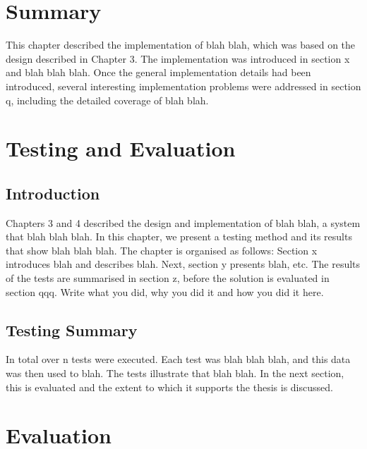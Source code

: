 \section{Summary} \label{s-i--summary}

This chapter described the implementation of blah blah, which was based on the design described in Chapter 3. The implementation was introduced in section x and blah blah blah. Once the general implementation details had been introduced, several interesting implementation problems were addressed in section q, including the detailed coverage of blah blah.

\section{Testing and Evaluation} \label{s-i--testing-and-evaluation}

\subsection{Introduction} \label{s-i--t-a-e--i}

Chapters 3 and 4 described the design and implementation of blah blah, a system that blah blah blah.  In this chapter, we present a testing method and its results that show blah blah blah.  The chapter is organised as follows:  Section x introduces blah and describes blah.  Next, section y presents blah, etc.
The results of the tests are summarised in section z, before the solution is evaluated in section qqq.
Write what you did, why you did it and how you did it here.

\subsection{Testing Summary} \label{s-i--testing-summary}

In total over n tests were executed. Each test was blah blah blah, and this data was then used to blah. The tests illustrate that blah blah. In the next section, this is evaluated and the extent to which it supports the thesis is discussed.



\section{Evaluation} \label{s-i--evaluation}

